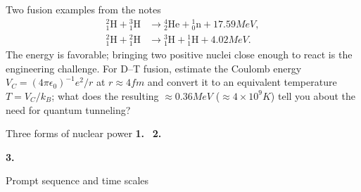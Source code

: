\begin{handoutcolumns}

\begin{fixedbox}{Two fusion examples from the notes}
\begin{align*}
{}^{2}_{1}\mathrm H+{}^{3}_{1}\mathrm H
 &\longrightarrow{}^{4}_{2}\mathrm{He}+{}^{1}_{0}\mathrm n+17.59\unit{MeV},\\
{}^{2}_{1}\mathrm H+{}^{2}_{1}\mathrm H
 &\longrightarrow{}^{3}_{1}\mathrm H+{}^{1}_{1}\mathrm H+4.02\unit{MeV}.
\end{align*}
The energy is favorable; bringing two positive nuclei close enough to react
is the engineering challenge.
For D--T fusion, estimate the Coulomb energy
$V_C=(4\pi\epsilon_0)^{-1}e^2/r$ at $r\approx 4\unit{fm}$ and convert it to an
equivalent temperature $T=V_C/k_B$; what does the
resulting $\approx 0.36\unit{MeV}$ ($\approx 4\times10^9\unit{K}$) tell you about the need for quantum tunneling?
\end{fixedbox}

\begin{fixedbox}{Three forms of nuclear power}
\scriptsize
\textbf{1.}\ \hfill
\textbf{2.}\ \par
\textbf{3.}\ 
\normalsize
\end{fixedbox}

\switchcolumn


\begin{fixedbox}{Prompt sequence and time scales}
\centering
{}
\end{fixedbox}
\end{handoutcolumns}
